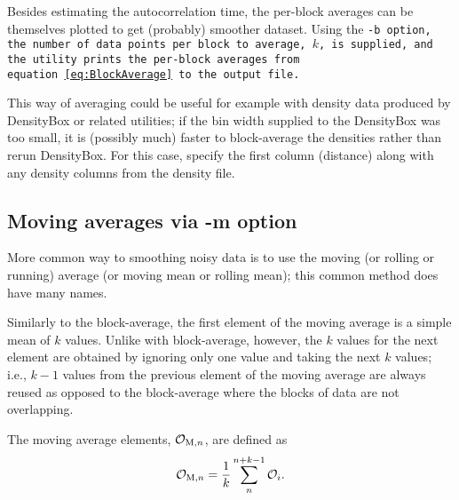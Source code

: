 Besides estimating the autocorrelation time, the per-block averages can be
themselves plotted to get (probably) smoother dataset. Using the \tt{-b} option,
the number of data points per block to average, $k$, is supplied, and the utility
prints the per-block averages from equation~\eqref{eq:BlockAverage} to the
output file.

This way of averaging could be useful for example with density data produced by
DensityBox or related utilities; if the bin width supplied to the DensityBox was
too small, it is (possibly much) faster to block-average the densities rather
than rerun DensityBox. For this case, specify the first column (distance) along
with any density columns from the density file.

\subsection{Moving averages via -m option}

More common way to smoothing noisy data is to use the moving (or rolling or
running) average (or moving mean or rolling mean); this common method does have
many names.

Similarly to the block-average, the first element of the moving average is a
simple mean of $k$ values. Unlike with block-average, however, the $k$ values
for the next element are obtained by ignoring only one value and taking the next
$k$ values; i.e., $k-1$ values from the previous element of the moving average
are always reused as opposed to the block-average where the blocks of data are
not overlapping.

The moving average elements, $\mathcal{O}_{\mathrm{M},n}$, are defined as
\begin{equation} \label{eq:MovingAverage}
  \mathcal{O}_{\mathrm{M},n} = \frac{1}{k}
    \sum^{n+k-1}_{n} \mathcal{O}_i.
\end{equation}

